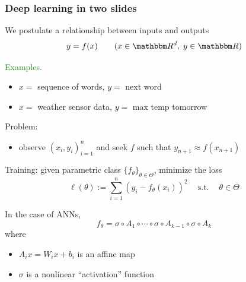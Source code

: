 \documentclass[
    xcolor={svgnames,dvipsnames},
    hyperref={colorlinks, citecolor=DeepPink4, linkcolor=DarkRed, urlcolor=DarkBlue}
    ]{beamer}  %
\newcommand{\Egs}{\textcolor{ForestGreen}{Examples. }}
\newcommand{\st}{\ensuremath{\ \mathrm{s.t.}\ }}
\newcommand{\1}{\mathbbm 1}
\newcommand{\RR}{\mathbbm R}
\begin{document}
\begin{frame}
    \frametitle{Deep learning in two slides}
    
    We postulate a relationship between inputs and outputs
    \begin{equation*}
        y = f(x)
        \qquad (x \in \RR^d, \; y \in \RR)
    \end{equation*}

    \Egs
    \begin{itemize}
        \item $x = $ sequence of words, $y = $ next word
        \vspace{0.5em}
        \item $x = $ weather sensor data, $y = $ max temp tomorrow
    \end{itemize}
        \vspace{0.5em}
        \vspace{0.5em}

    Problem:

    \begin{itemize}
        \item observe $(x_i, y_i)_{i=1}^n$ and seek $f$ such that $y_{n+1}
            \approx f(x_{n+1})$
    \end{itemize}


\end{frame}


\begin{frame}

    Training: given parametric class $\{f_\theta\}_{\theta \in \Theta}$,
    minimize the loss
    \begin{equation*}
        \ell(\theta) := \sum_{i=1}^n (y_i - f_\theta(x_i))^2
        \quad \st \quad \theta \in \Theta
    \end{equation*}

    \pause
    \vspace{0.5em}
    \vspace{0.5em}
    In the case of ANNs, 
    \begin{equation*}
        f_\theta
        = \sigma \circ A_{1} 
            \circ \cdots \circ \sigma \circ A_{k-1}  \circ \sigma \circ A_{k}
    \end{equation*}
    where
    \begin{itemize}
        \item $A_{i} x = W_i x + b_i $ is an affine map 
        \vspace{0.5em}
        \item $\sigma$ is a nonlinear ``activation'' function
    \end{itemize}

\end{frame}
\end{document}
